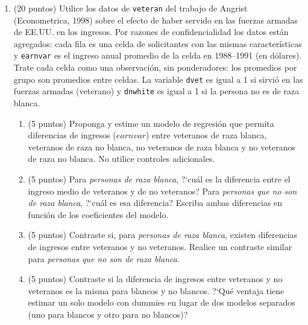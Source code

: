 \documentclass[letterpaper,11pt]{article}
\theoremstyle{plain}
\theoremstyle{definition}
\theoremstyle{remark}
\begin{document}
\begin{enumerate}

\item (20 puntos) Utilice los datos de \texttt{veteran} del trabajo de Angrist (Econometrica,
    1998) sobre el efecto de haber servido en las fuerzas armadas de EE.UU. en los ingresos.
    Por razones de confidencialidad los datos est\'an agregados: cada fila es una celda de
    solicitantes con las mismas caracter\'isticas y \texttt{earnvar} es el ingreso anual promedio
    de la celda en 1988--1991 (en d\'olares). Trate cada celda como una observaci\'on, sin
    ponderadores: los promedios por grupo son promedios entre celdas. La
    variable \texttt{dvet} es igual a 1 si sirvi\'o en las fuerzas armadas (veterano) y
    \texttt{dnwhite} es igual a 1 si la persona no es de raza blanca.
    \begin{enumerate}
        \item (5 puntos) Proponga y estime un modelo de regresi\'on que permita diferencias de
            ingresos ($earnvar$) entre veteranos de raza blanca, veteranos de raza no blanca, no
            veteranos de raza blanca y no veteranos de raza no blanca. No utilice controles
            adicionales.
        \item (5 puntos) Para \emph{personas de raza blanca}, ?`cu\'al es la diferencia entre
            el ingreso medio de veteranos y de no veteranos? Para \emph{personas que no son de
            raza blanca}, ?`cu\'al es esa diferencia? Escriba ambas diferencias en funci\'on de
            los coeficientes del modelo.
        \item (5 puntos) Contraste si, para \emph{personas de raza blanca}, existen diferencias
            de ingresos entre veteranos y no veteranos. Realice un contraste similar para
            \emph{personas que no son de raza blanca}.
        \item (5 puntos) Contraste si la diferencia de ingresos entre veteranos y no veteranos
            es la misma para blancos y no blancos. ?`Qu\'e ventaja tiene estimar un solo modelo
            con dummies en lugar de dos modelos separados (uno para blancos y otro para no
            blancos)?
    \end{enumerate}


\end{enumerate}
\end{document}
